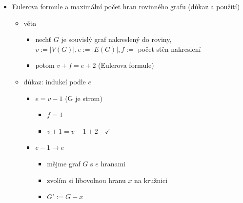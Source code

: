 \begin{itemize}
\begin{itemize}
\begin{itemize}
\end{itemize}
\item stěny nakreslení
\begin{itemize}
\item části, na které nakreslení grafu rozděluje rovinu
\item stěnou je i vnější stěna (zbytek roviny)
\item hranice stěny - skládá se z hran
\item hranice stěny je nakreslení uzavřeného sledu
\end{itemize}
\item graf je rovinný, pokud má alespoň jedno rovinné nakreslení
\item topologický graf je uspořádaná dvojice (graf, nakreslení)
\item $K_5$ a $K_{3,3}$ nejsou rovinné
\begin{itemize}
\item graf je rovinný, právě když žádný jeho podgraf není izomorfní s nějakým dělením grafu $K_5$ nebo $K_{3,3}$ (tzn. podgraf může mít podrozdělené hrany - \quotedblbase{}$K_5$\textquotedblleft{} s libovolně podrozdělenými hranami pořád nebude rovinná)
\end{itemize}
\end{itemize}
\item Eulerova formule a maximální počet hran rovinného grafu (důkaz a použití)
\begin{itemize}
\item věta
\begin{itemize}
\item nechť $G$ je souvislý graf nakreslený do roviny, $v:=|V(G)|, e:=|E(G)|, f:=$ počet stěn nakreslení
\item potom $v+f=e+2$ (Eulerova formule)
\end{itemize}
\item důkaz: indukcí podle $e$
\begin{itemize}
\item $e=v-1$ (G je strom)
\begin{itemize}
\item $f=1$
\item $v+1=v-1+2\quad\checkmark$
\end{itemize}
\item $e-1\to e$
\begin{itemize}
\item mějme graf $G$ s $e$ hranami
\item zvolím si libovolnou hranu $x$ na kružnici
\item $G':=G-x$

\end{itemize}
\end{itemize}
\end{itemize}
\end{itemize}
